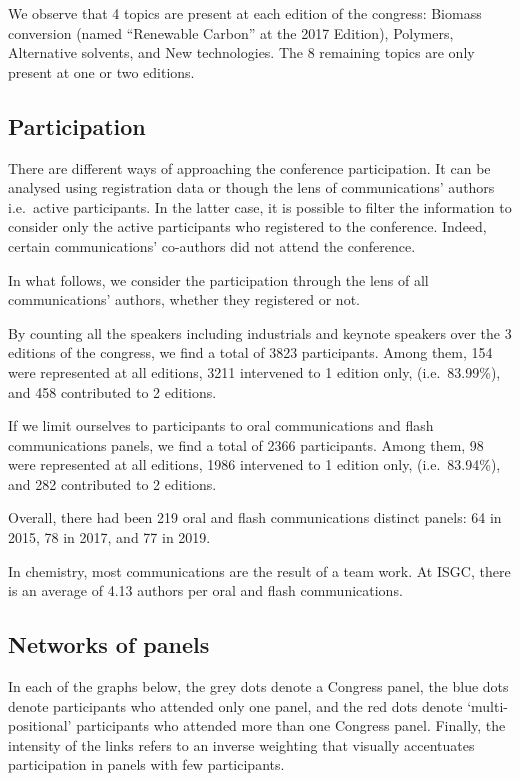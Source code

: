 \documentclass[
]{article}
\begin{document}
We observe that 4 topics are present at each edition of the congress:
Biomass conversion (named ``Renewable Carbon'' at the 2017 Edition),
Polymers, Alternative solvents, and New technologies. The 8 remaining
topics are only present at one or two editions.

\hypertarget{participation}{%
\subsection{Participation}\label{participation}}

There are different ways of approaching the conference participation. It
can be analysed using registration data or though the lens of
communications' authors i.e.~active participants. In the latter case, it
is possible to filter the information to consider only the active
participants who registered to the conference. Indeed, certain
communications' co-authors did not attend the conference.

In what follows, we consider the participation through the lens of all
communications' authors, whether they registered or not.

By counting all the speakers including industrials and keynote speakers
over the 3 editions of the congress, we find a total of 3823
participants. Among them, 154 were represented at all editions, 3211
intervened to 1 edition only, (i.e.~83.99\%), and 458 contributed to 2
editions.

If we limit ourselves to participants to oral communications and flash
communications panels, we find a total of 2366 participants. Among them,
98 were represented at all editions, 1986 intervened to 1 edition only,
(i.e.~83.94\%), and 282 contributed to 2 editions.

Overall, there had been 219 oral and flash communications distinct
panels: 64 in 2015, 78 in 2017, and 77 in 2019.

In chemistry, most communications are the result of a team work. At
ISGC, there is an average of 4.13 authors per oral and flash
communications.

\hypertarget{networks-of-panels}{%
\subsection{Networks of panels}\label{networks-of-panels}}

In each of the graphs below, the grey dots denote a Congress panel, the
blue dots denote participants who attended only one panel, and the red
dots denote `multi-positional' participants who attended more than one
Congress panel. Finally, the intensity of the links refers to an inverse
weighting that visually accentuates participation in panels with few
participants.
\end{document}
